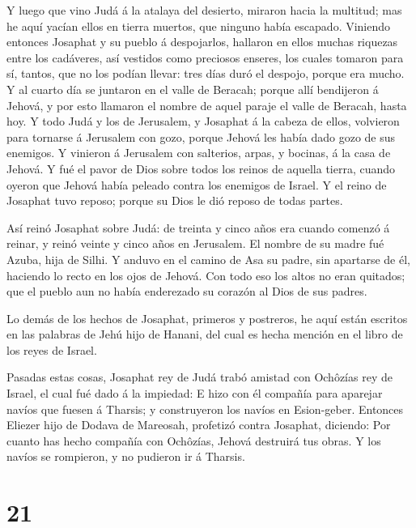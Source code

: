 Y luego que vino Judá á la atalaya del desierto, miraron
hacia la multitud; mas he aquí yacían ellos en tierra muertos, que
ninguno había escapado.  Viniendo entonces Josaphat y su
pueblo á despojarlos, hallaron en ellos muchas riquezas entre los
cadáveres, así vestidos como preciosos enseres, los cuales tomaron para
sí, tantos, que no los podían llevar: tres días duró el despojo, porque
era mucho.  Y al cuarto día se juntaron en el valle de
Beracah; porque allí bendijeron á Jehová, y por esto llamaron el nombre
de aquel paraje el valle de Beracah, hasta hoy.  Y todo
Judá y los de Jerusalem, y Josaphat á la cabeza de ellos, volvieron para
tornarse á Jerusalem con gozo, porque Jehová les había dado gozo de sus
enemigos.  Y vinieron á Jerusalem con salterios, arpas, y
bocinas, á la casa de Jehová.  Y fué el pavor de Dios sobre
todos los reinos de aquella tierra, cuando oyeron que Jehová había
peleado contra los enemigos de Israel.  Y el reino de
Josaphat tuvo reposo; porque su Dios le dió reposo de todas partes.

 Así reinó Josaphat sobre Judá: de treinta y cinco años era
cuando comenzó á reinar, y reinó veinte y cinco años en Jerusalem. El
nombre de su madre fué Azuba, hija de Silhi.  Y anduvo en
el camino de Asa su padre, sin apartarse de él, haciendo lo recto en los
ojos de Jehová.  Con todo eso los altos no eran quitados;
que el pueblo aun no había enderezado su corazón al Dios de sus padres.

 Lo demás de los hechos de Josaphat, primeros y postreros,
he aquí están escritos en las palabras de Jehú hijo de Hanani, del cual
es hecha mención en el libro de los reyes de Israel.

 Pasadas estas cosas, Josaphat rey de Judá trabó amistad
con Ochôzías rey de Israel, el cual fué dado á la impiedad:
 E hizo con él compañía para aparejar navíos que fuesen á
Tharsis; y construyeron los navíos en Esion-geber. 
Entonces Eliezer hijo de Dodava de Mareosah, profetizó contra Josaphat,
diciendo: Por cuanto has hecho compañía con Ochôzías, Jehová destruirá
tus obras. Y los navíos se rompieron, y no pudieron ir á Tharsis.

\hypertarget{section-20}{%
\section{21}\label{section-20}}


